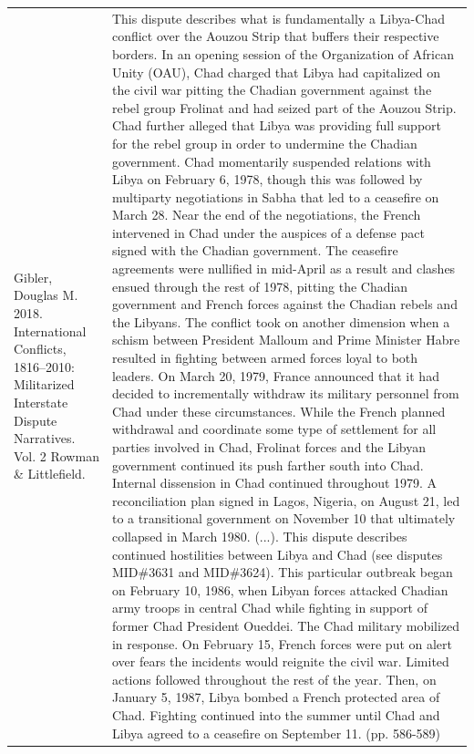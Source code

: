 {\begin{longtable}{p{}p{}}
Gibler, Douglas M. 2018. International Conflicts, 1816–2010: Militarized Interstate Dispute Narratives. Vol. 2 Rowman \& Littlefield. & This dispute describes what is fundamentally a Libya-Chad conflict over the Aouzou Strip that buffers their respective borders. In an opening session of the Organization of African Unity (OAU), Chad charged that Libya had capitalized on the civil war pitting the Chadian government against the rebel group Frolinat and had seized part of the Aouzou Strip. Chad further alleged that Libya was providing full support for the rebel group in order to undermine the Chadian government. Chad momentarily suspended relations with Libya on February 6, 1978, though this was followed by multiparty negotiations in Sabha that led to a ceasefire on March 28. Near the end of the negotiations, the French intervened in Chad under the auspices of a defense pact signed with the Chadian government. The ceasefire agreements were nullified in mid-April as a result and clashes ensued through the rest of 1978, pitting the Chadian government and French forces against the Chadian rebels and the Libyans. The conflict took on another dimension when a schism between President Malloum and Prime Minister Habre resulted in fighting between armed forces loyal to both leaders. On March 20, 1979, France announced that it had decided to incrementally withdraw its military personnel from Chad under these circumstances. While the French planned withdrawal and coordinate some type of settlement for all parties involved in Chad, Frolinat forces and the Libyan government continued its push farther south into Chad. Internal dissension in Chad continued throughout 1979. A reconciliation plan signed in Lagos, Nigeria, on August 21, led to a transitional government on November 10 that ultimately collapsed in March 1980. (...). 
This dispute describes continued hostilities between Libya and Chad (see disputes MID\#3631 and MID\#3624). This particular outbreak began on February 10, 1986, when Libyan forces attacked Chadian army troops in central Chad while fighting in support of former Chad President Oueddei. The Chad military mobilized in response. On February 15, French forces were put on alert over fears the incidents would reignite the civil war. Limited actions followed throughout the rest of the year. Then, on January 5, 1987, Libya bombed a French protected area of Chad. Fighting continued into the summer until Chad and Libya agreed to a ceasefire on September 11. (pp. 586-589)
\\

\end{longtable}}
